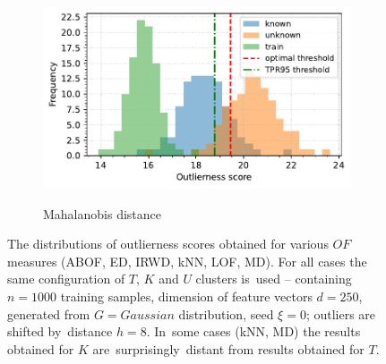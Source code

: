 \begin{figure}[t]
\begin{subfigure}[b]{0.495\textwidth}
        \label{fig:histogram-lof}
    \end{subfigure}
    \hfill
    \begin{subfigure}[b]{0.495\textwidth}
        \centering
        \caption{\small Mahalanobis distance}
        \includegraphics[width=\textwidth]{images/distributions/histograms/hist-distributions-dimension_250-samples_1000-distance_8-distribution_gaussian-model_MD-seed_0.pdf}
        \label{fig:histogram-mahalanobis}
    \end{subfigure}
    \caption{The distributions of outlierness scores obtained for various $OF$ measures (ABOF, ED, IRWD, kNN, LOF, MD). For all cases the same configuration of $T$, $K$ and $U$ clusters is~used – containing $n = 1000$ training samples, dimension of feature vectors $d = 250$, generated from $G = \textit{Gaussian}$ distribution, seed $\xi = 0$; outliers are shifted by~distance $h = 8$. In~some cases (kNN, MD) the results obtained for $K$ are~surprisingly~distant from results obtained for $T$.}
    \label{fig:histograms}
\end{figure}

